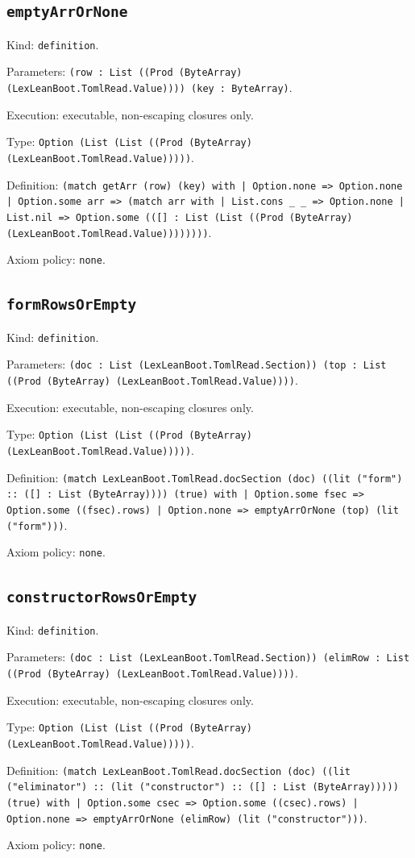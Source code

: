 \documentclass[11pt]{article}
\begin{document}
\subsection*{\texttt{emptyArrOrNone}}
\noindent Kind: \texttt{definition}.\par
\noindent Parameters: \texttt{(row : List ((Prod (ByteArray) (LexLeanBoot.TomlRead.Value)))) (key : ByteArray)}.\par
\noindent Execution: executable, non-escaping closures only.\par
\noindent Type: \texttt{Option (List (List ((Prod (ByteArray) (LexLeanBoot.TomlRead.Value)))))}.\par
\noindent Definition: \texttt{(match getArr (row) (key) with | Option.none => Option.none | Option.some arr => (match arr with | List.cons \_ \_ => Option.none | List.nil => Option.some (([] : List (List ((Prod (ByteArray) (LexLeanBoot.TomlRead.Value))))))))}.\par
\noindent Axiom policy: \texttt{none}.\par
\subsection*{\texttt{formRowsOrEmpty}}
\noindent Kind: \texttt{definition}.\par
\noindent Parameters: \texttt{(doc : List (LexLeanBoot.TomlRead.Section)) (top : List ((Prod (ByteArray) (LexLeanBoot.TomlRead.Value))))}.\par
\noindent Execution: executable, non-escaping closures only.\par
\noindent Type: \texttt{Option (List (List ((Prod (ByteArray) (LexLeanBoot.TomlRead.Value)))))}.\par
\noindent Definition: \texttt{(match LexLeanBoot.TomlRead.docSection (doc) ((lit ("form") :: ([] : List (ByteArray)))) (true) with | Option.some fsec => Option.some ((fsec).rows) | Option.none => emptyArrOrNone (top) (lit ("form")))}.\par
\noindent Axiom policy: \texttt{none}.\par
\subsection*{\texttt{constructorRowsOrEmpty}}
\noindent Kind: \texttt{definition}.\par
\noindent Parameters: \texttt{(doc : List (LexLeanBoot.TomlRead.Section)) (elimRow : List ((Prod (ByteArray) (LexLeanBoot.TomlRead.Value))))}.\par
\noindent Execution: executable, non-escaping closures only.\par
\noindent Type: \texttt{Option (List (List ((Prod (ByteArray) (LexLeanBoot.TomlRead.Value)))))}.\par
\noindent Definition: \texttt{(match LexLeanBoot.TomlRead.docSection (doc) ((lit ("eliminator") :: (lit ("constructor") :: ([] : List (ByteArray))))) (true) with | Option.some csec => Option.some ((csec).rows) | Option.none => emptyArrOrNone (elimRow) (lit ("constructor")))}.\par
\noindent Axiom policy: \texttt{none}.\par
\end{document}
